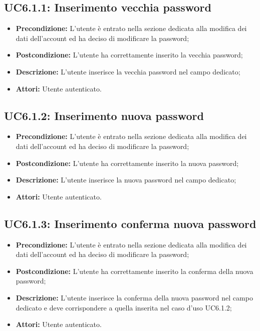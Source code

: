 \subsection{ UC6.1.1: Inserimento vecchia password}

\begin{itemize}
	\item \textbf{Precondizione:} L’utente è entrato nella sezione dedicata alla modifica dei dati dell’account ed ha deciso di modificare la password;
	\item \textbf{Postcondizione:} L’utente ha correttamente inserito la vecchia password;
	\item \textbf{Descrizione:} L’utente inserisce la vecchia password nel campo dedicato;
	\item \textbf{Attori:} Utente autenticato.
\end{itemize}
\subsection{ UC6.1.2: Inserimento nuova password}

\begin{itemize}
	\item \textbf{Precondizione:} L’utente è entrato nella sezione dedicata alla modifica dei dati dell’account ed ha deciso di modificare la password;
	\item \textbf{Postcondizione:}  L’utente ha correttamente inserito la nuova password;
	\item \textbf{Descrizione:} L’utente inserisce la nuova password nel campo dedicato;
	\item \textbf{Attori:} Utente autenticato.
\end{itemize}
\subsection{ UC6.1.3: Inserimento conferma nuova password}

\begin{itemize}
	\item \textbf{Precondizione:} L’utente è entrato nella sezione dedicata alla modifica dei dati dell’account ed ha deciso di modificare la password;
	\item \textbf{Postcondizione:} L’utente ha correttamente inserito la conferma della nuova password;
	\item \textbf{Descrizione:} L’utente inserisce la conferma della nuova password nel campo dedicato e deve corrispondere a quella inserita nel caso d’uso UC6.1.2;
	\item \textbf{Attori:} Utente autenticato.
\end{itemize}
